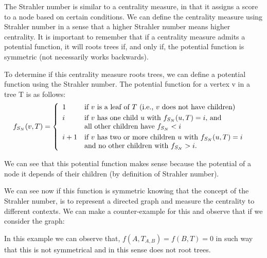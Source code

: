 
The Strahler number is similar to a centrality measure, in that it assigns a score to a node based on certain conditions. We can define the centrality measure using Strahler number in a sense that a higher Strahler number means higher centrality. It is important to remember that if a centrality measure admits a potential function, it will roots trees if, and only if, the potential function is symmetric (not necessarily works backwards). 

To determine if this centrality measure roots trees, we can define a potential function using the Strahler number. The potential function for a vertex v in a tree T is as follows:
    \begin{equation*}
        f_{S_{N}} (v,T) = \left\{ \begin{array}{llc}
             1 &   \text{if $v$ is a leaf of $T$ (i.e., $v$ does not have children)}  & \smallskip \\ 
              i & \text{if $v$ has one child $u$ with $f_{S_{N}}(u, T) = i$, and} \\
              	& \text{all other children have  $f_{S_{N}} < i$} \smallskip \\
              i + 1 &  \text{if $v$ has two or more children $u$ with $f_{S_{N}}(u, T) = i$} \\
              & \text{and no other children with $f_{S_{N}} > i$.} \\
             \end{array}
   \right.
    \end{equation*}
    
We can see that this potential function makes sense because the potential of a node it depends of their children (by definition of Strahler number).

We can see now if this function is symmetric knowing that the concept of the Strahler number, is to represent a directed graph and measure the centrality to different contexts. We can make a counter-example for this and observe that if we consider the graph:
\begin{center}
\end{center}
In this example we can observe that, $f(A,T_{A,B}) =  f(B,T) = 0$ in such way that this is not symmetrical and in this sense does not root trees.

